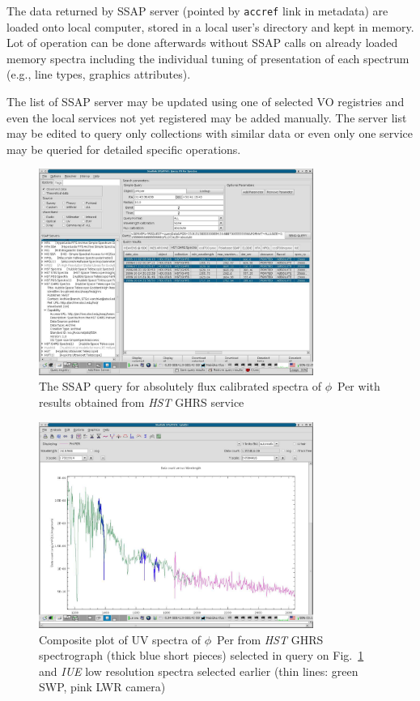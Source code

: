 \documentclass[final,authoryear,5p,times,twocolumn]{elsarticle}
\begin{document}
The data returned by SSAP server (pointed by \texttt{accref} link in
metadata) are loaded onto local computer, stored in a local user's
directory and kept in memory.  Lot of operation can be done afterwards
without SSAP calls on already loaded memory spectra including the
individual tuning of presentation of each spectrum (e.g., line types,
graphics attributes).

The list of SSAP server may be updated using one of selected VO
registries and even the local services not yet registered may be added
manually. The server list may be edited to query only collections with
similar data or even only one service may be queried for detailed
specific operations.

\begin{figure}[Ht]
\begin{center}
\includegraphics[width=0.8\textwidth]{hst_query.pdf}
\caption{The SSAP query for absolutely flux calibrated  spectra of $\phi$~Per with results obtained from \emph{HST} GHRS service}
\label{fig:hst_query}
\end{center}
\end{figure}


\begin{figure}[t]
\begin{center}
\includegraphics[width=0.8\textwidth]{iuehst2.pdf}
\caption{Composite plot of UV spectra of $\phi$~Per from  \emph{HST}
  GHRS spectrograph (thick blue short pieces) selected in query on Fig.~\ref{fig:hst_query} and
  \emph{IUE} low resolution spectra selected earlier (thin lines:
  green SWP, pink LWR camera)}
\label{fig:iuehst2}
\end{center}
\end{figure}
\end{document}
